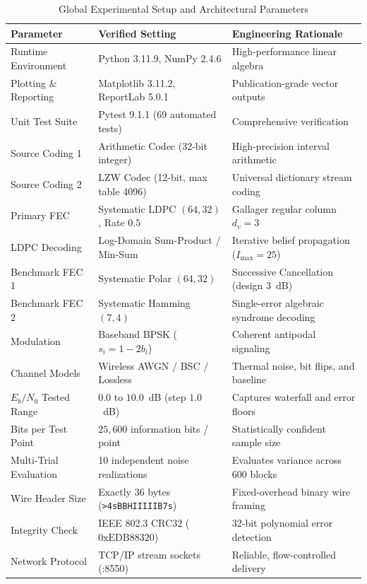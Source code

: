 \documentclass[conference]{IEEEtran}
\begin{document}
\begin{table}[htbp]
\caption{Global Experimental Setup and Architectural Parameters}
\label{tab:params}
\centering
\scriptsize
\begin{tabular}{lll}
\toprule
\textbf{Parameter} & \textbf{Verified Setting} & \textbf{Engineering Rationale} \\
\midrule
Runtime Environment & Python 3.11.9, NumPy 2.4.6 & High-performance linear algebra \\
Plotting \& Reporting & Matplotlib 3.11.2, ReportLab 5.0.1 & Publication-grade vector outputs \\
Unit Test Suite & Pytest 9.1.1 (69 automated tests) & Comprehensive verification \\
Source Coding 1 & Arithmetic Codec (32-bit integer) & High-precision interval arithmetic \\
Source Coding 2 & LZW Codec (12-bit, max table 4096) & Universal dictionary stream coding \\
Primary FEC & Systematic LDPC $(64, 32)$, Rate $0.5$ & Gallager regular column $d_v=3$ \\
LDPC Decoding & Log-Domain Sum-Product / Min-Sum & Iterative belief propagation ($I_{\max}=25$) \\
Benchmark FEC 1 & Systematic Polar $(64, 32)$ & Successive Cancellation (design $3$~dB) \\
Benchmark FEC 2 & Systematic Hamming $(7, 4)$ & Single-error algebraic syndrome decoding \\
Modulation & Baseband BPSK ($s_i = 1 - 2b_i$) & Coherent antipodal signaling \\
Channel Models & Wireless AWGN / BSC / Lossless & Thermal noise, bit flips, and baseline \\
$E_b/N_0$ Tested Range & $0.0$ to $10.0$~dB (step $1.0$~dB) & Captures waterfall and error floors \\
Bits per Test Point & $25,600$ information bits / point & Statistically confident sample size \\
Multi-Trial Evaluation & 10 independent noise realizations & Evaluates variance across 600 blocks \\
Wire Header Size & Exactly 36 bytes (\texttt{>4sBBHIIIIIB7s}) & Fixed-overhead binary wire framing \\
Integrity Check & IEEE 802.3 CRC32 ($0\text{xEDB88320}$) & 32-bit polynomial error detection \\
Network Protocol & TCP/IP stream sockets (:8550) & Reliable, flow-controlled delivery \\
\bottomrule
\end{tabular}
\end{table}
\end{document}
